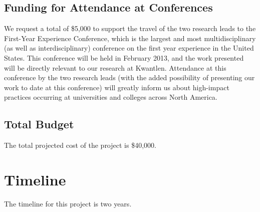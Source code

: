 \documentclass[letterpaper,10pt,headsepline]{scrreprt}
\begin{document}
\subsection{Funding for Attendance at Conferences}

We request a total of \$5,000 to support the travel of the two research leads
to the First-Year Experience Conference, which is the largest and most
multidisciplinary (as well as interdisciplinary) conference on the first year
experience in the United States. This conference will be held in February
2013, and the work presented will be directly relevant to our research at
Kwantlen. Attendance at this conference by the two research leads (with the
added possibility of presenting our work to date at this conference) will
greatly inform us about high-impact practices occurring at universities and
colleges across North America.

\subsection{Total Budget}

The total projected cost of the project is \$40,000.

\section{Timeline}

The timeline for this project is two years.
\end{document}
